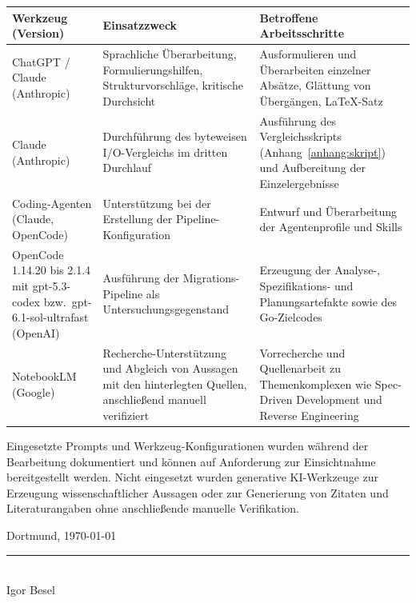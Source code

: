 \begin{table}[H]
\centering
\begin{tabular}{|p{4.0cm}|p{4.5cm}|p{4.5cm}|}
\hline
\textbf{Werkzeug (Version)} & \textbf{Einsatzzweck} & \textbf{Betroffene Arbeitsschritte} \\
\hline
ChatGPT / Claude (Anthropic) & Sprachliche Überarbeitung, Formulierungshilfen, Strukturvorschläge, kritische Durchsicht & Ausformulieren und Überarbeiten einzelner Absätze, Glättung von Übergängen, \LaTeX-Satz \\
\hline
Claude (Anthropic) & Durchführung des byteweisen I/O-Vergleichs im dritten Durchlauf & Ausführung des Vergleichsskripts (Anhang~\ref{anhang:skript}) und Aufbereitung der Einzelergebnisse \\
\hline
Coding-Agenten (Claude, OpenCode) & Unterstützung bei der Erstellung der Pipeline-Konfiguration & Entwurf und Überarbeitung der Agentenprofile und Skills \\
\hline
OpenCode 1.14.20 bis 2.1.4 mit gpt-5.3-codex bzw.\ gpt-6.1-sol-ultrafast (OpenAI) & Ausführung der Migrations-Pipeline als Untersuchungsgegenstand & Erzeugung der Analyse-, Spezifikations- und Planungsartefakte sowie des Go-Zielcodes \\
\hline
NotebookLM (Google) & Recherche-Unterstützung und Abgleich von Aussagen mit den hinterlegten Quellen, anschließend manuell verifiziert & Vorrecherche und Quellenarbeit zu Themenkomplexen wie Spec-Driven Development und Reverse Engineering \\
\hline
\end{tabular}
\end{table}

Eingesetzte Prompts und Werkzeug-Konfigurationen wurden während der Bearbeitung dokumentiert und können auf Anforderung zur Einsichtnahme bereitgestellt werden. Nicht eingesetzt wurden generative KI-Werkzeuge zur Erzeugung wissenschaftlicher Aussagen oder zur Generierung von Zitaten und Literaturangaben ohne anschließende manuelle Verifikation.

\vspace{4\baselineskip}
Dortmund, \today \hfill \rule{6cm}{0.4pt}\\
\hspace*{0pt}\hfill Igor Besel
